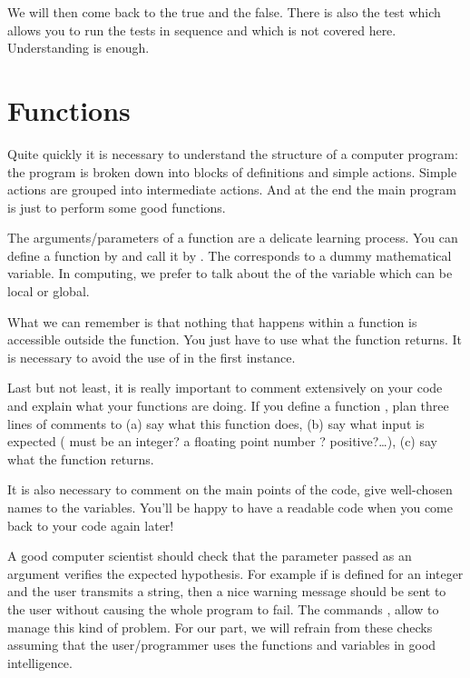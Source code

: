 \documentclass[11pt,class=report,crop=false]{standalone}
\begin{document}
We will then come back to the \og{}true\fg{} and the \og{}false\fg{}.
There is also the test
which allows you to run the tests in sequence and which is not covered here. 
Understanding  is enough.


\section{Functions}

Quite quickly it is necessary to understand the structure of a computer program: the program is broken down into blocks of definitions and simple actions. Simple actions are grouped into intermediate actions. And at the end the main program is just to perform some good functions.

The arguments/parameters of a function are a delicate learning process.
You can define a function by  and call it by
. The  corresponds to a dummy mathematical variable. 
In computing, we prefer to talk about the  of the variable which can be local or global.

What we can remember is that nothing that happens within a function is accessible outside the function. You just have to use what the function returns.
It is necessary to avoid the use of  in the first instance.

Last but not least, it is really important to comment extensively on your code and explain what your functions are doing. If you define a function , plan three lines of comments to (a) say what this function does, (b) say what input is expected ( must be an integer? a floating point number ? positive?\ldots), (c) say what the function returns.

It is also necessary to comment on the main points of the code, give well-chosen names to the variables. You'll be happy to have a readable code when you come back to your code again later!

A good computer scientist should check that the parameter passed as an argument verifies the expected hypothesis. For example if  is defined for an integer  and the user transmits a string, then a nice warning message should be sent to the user without causing the whole program to fail.
The commands ,  allow to manage this kind of problem. 
For our part, we will refrain from these checks assuming that the user/programmer uses the functions and variables in good intelligence.
\end{document}
